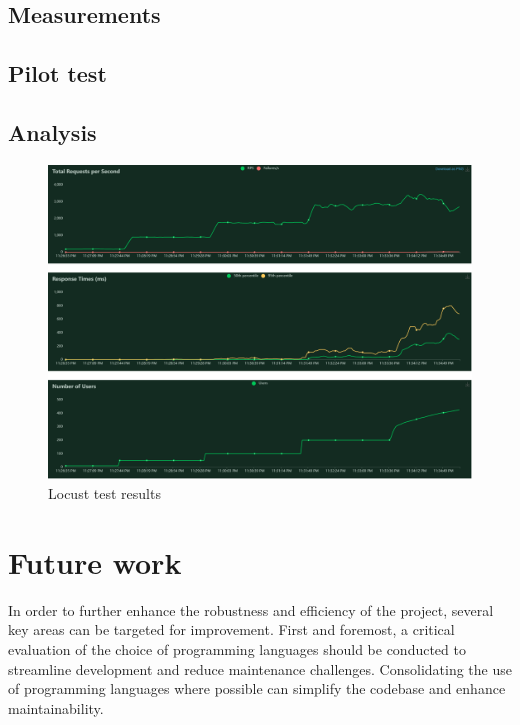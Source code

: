 \documentclass[conference]{IEEEtran}
\begin{document}
\subsection{Measurements}
\label{sec:measurements}


\subsection{Pilot test}
\label{sec:pilot_test}

\subsection{Analysis}
\label{sec:analysis}

\begin{figure}
    \centering
    \includegraphics[width=1\linewidth]{total_requests_per_second_1702247160.png}
    \caption{Locust test results}
    \label{fig:enter-label}
\end{figure}

\section{Future work}

In order to further enhance the robustness and efficiency of the project, several key areas can be targeted for improvement. First and foremost, a critical evaluation of the choice of programming languages should be conducted to streamline development and reduce maintenance challenges. Consolidating the use of programming languages where possible can simplify the codebase and enhance maintainability.
\end{document}
